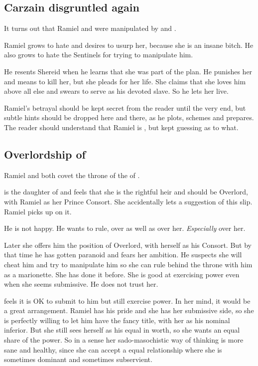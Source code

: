 \begin{garbage}
\subsection{Carzain disgruntled again} 
It turns out that Ramiel and \Belzir{} were manipulated by \Secherdamon{} and \Psyrex. 

Ramiel grows to hate \Belzir{} and desires to usurp her, because she is an insane bitch. He also grows to hate the Sentinels for trying to manipulate him. 

He resents Shereid when he learns that she was part of the plan. He punishes her and means to kill her, but she pleads for her life. She claims that she loves him above all else and swears to serve as his devoted slave. So he lets her live. 

Ramiel's betrayal should be kept secret from the reader until the very end, but subtle hints should be dropped here and there, as he plots, schemes and prepares. The reader should understand that Ramiel is , but kept guessing as to what.









\subsection{Overlordship of \Mystraacht}
Ramiel and \Shiaraid{} both covet the throne of the  of \Mystraacht. 

\Shiaraid{} is the daughter of \hs{\Zachirah} and feels that she is the rightful heir and should be Overlord, with Ramiel as her Prince Consort. 
She accidentally lets a suggestion of this slip. 
Ramiel picks up on it. 

He is not happy. 
He wants to rule, over \Mystraacht{} as well as over her. 
\emph{Especially} over her. 

Later she offers him the position of Overlord, with herself as his Consort. 
But by that time he has gotten paranoid and fears her ambition. 
He suspects she will cheat him and try to manipulate him so she can rule behind the throne with him as a marionette. 
She has done it before. 
She is good at exercising power even when she seems submissive. 
He does not trust her. 

\Shiaraid{} feels it is OK to submit to him but still exercise power. 
In her mind, it would be a great arrangement. 
Ramiel has his pride and she has her submissive side, so she is perfectly willing to let him have the fancy title, with her as his nominal inferior. 
But she still sees herself as his equal in worth, so she wants an equal share of the power. 
So in a sense her sado-masochistic way of thinking is more sane and healthy, since she can accept a equal relationship where she is sometimes dominant and sometimes subservient. 


\end{garbage}
